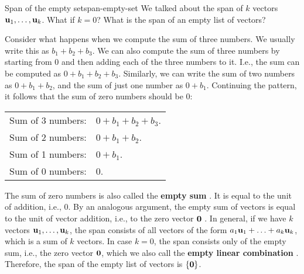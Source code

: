 \begin{example}{Span of the empty set}{span-empty-set}
  We talked about the span of $k$ vectors
  $\mbox{\bf u}_1,\ldots,\mbox{\bf u}_k$.  What if $k=0$? What is
  the span of an empty list of vectors? 
\end{example}

\begin{solution}
  Consider what happens when we compute the sum of three numbers. We
  usually write this as $b_1+b_2+b_3$. We can also compute the sum of
  three numbers by starting from $0$ and then adding each of the three
  numbers to it. I.e., the sum can be computed as
  $0+b_1+b_2+b_3$. Similarly, we can write the sum of two numbers as
  $0+b_1+b_2$, and the sum of just one number as $0+b_1$. Continuing
  the pattern, it follows that the sum of zero numbers should be $0$:
  \begin{center}
    \begin{tabular}{ll}
      Sum of 3 numbers: & $0+b_1+b_2+b_3$. \\
      Sum of 2 numbers: & $0+b_1+b_2$. \\
      Sum of 1 numbers: & $0+b_1$. \\
      Sum of 0 numbers: & $0$. \\
    \end{tabular}
  \end{center}
  The sum of zero numbers is also called the \textbf{empty sum}%
  . It is equal to the unit of addition, i.e., $0$.
  By an analogous argument, the empty sum of vectors is equal to the
  unit of vector addition, i.e., to the zero vector $\mbox{\bf 0}$%
  .  In general, if we
  have $k$ vectors $\mbox{\bf u}_1,\ldots,\mbox{\bf u}_k$, the span consists
  of all vectors of the form $a_1\mbox{\bf u}_1+\ldots+a_k\mbox{\bf u}_k$,
  which is a sum of $k$ vectors.  In case $k=0$, the span consists
  only of the empty sum, i.e., the zero vector $\mbox{\bf 0}$, which we
  also call the \textbf{empty linear combination}%
  . Therefore, the span of the empty
  list of vectors is $\left\{\mbox{\bf 0}\right\}$.
\end{solution}
